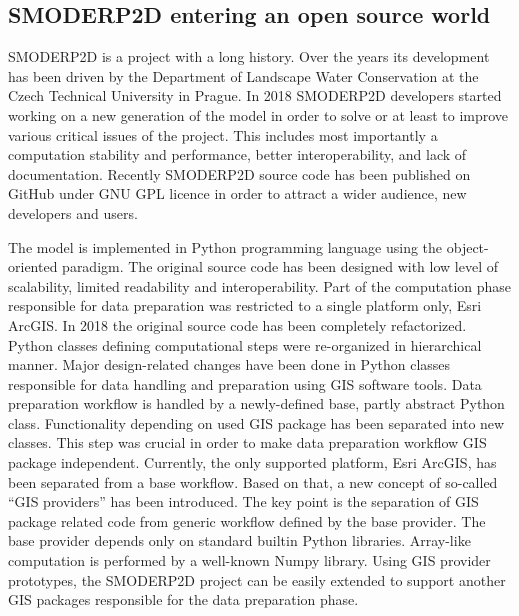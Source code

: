 \subsection{SMODERP2D entering an open source world}\label{ref:open_source_providers}

SMODERP2D is a project with a long history. Over the years its
development has been driven by the Department of Landscape Water
Conservation at the Czech Technical University in Prague. In 2018
SMODERP2D developers started working on a new generation of the model
in order to solve or at least to improve various critical issues of
the project. This includes most importantly a computation stability
and performance, better interoperability, and lack of
documentation. Recently SMODERP2D source code has been published on
GitHub \cite{smoderp2d-github-2019} under GNU GPL licence in order to
attract a wider audience, new developers and users.

The model is implemented in Python programming language using the
object-oriented paradigm. The original source code has been designed
with low level of scalability, limited readability and
interoperability. Part of the computation phase responsible for data
preparation was restricted to a single platform only, Esri ArcGIS. In
2018 the original source code has been completely refactorized. Python
classes defining computational steps were re-organized in hierarchical
manner. Major design-related changes have been done in Python classes
responsible for data handling and preparation using GIS software
tools. Data preparation workflow is handled by a newly-defined base,
partly abstract Python class. Functionality depending on used GIS
package has been separated into new classes. This step was crucial in
order to make data preparation workflow GIS package
independent. Currently, the only supported platform, Esri ArcGIS, has
been separated from a base workflow. Based on that, a new concept of
so-called “GIS providers” has been introduced. The key point is the
separation of GIS package related code from generic workflow defined
by the base provider. The base provider depends only on standard
builtin Python libraries. Array-like computation is performed by a
well-known Numpy library. Using GIS provider prototypes, the SMODERP2D
project can be easily extended to support another GIS packages
responsible for the data preparation phase.

